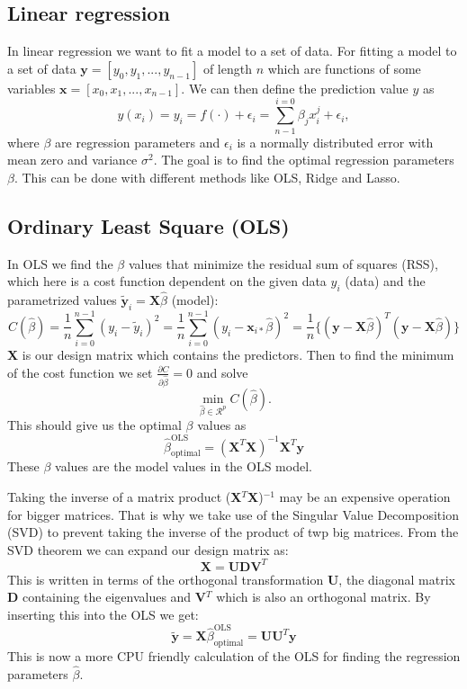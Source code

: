 \documentclass[12pt,a4paper,english]{article}
\begin{document}
\subsection{Linear regression}
In linear regression we want to fit a model to a set of data. For fitting a model to a set of data $\textbf{y}=[y_0, y_1,...,y_{n-1}]$ of length $n$ which are functions of some variables $\textbf{x}=[x_0, x_1,...,x_{n-1}]$. We can then define the prediction value $y$ as
\begin{equation}
\label{eq:pred_y}
y(x_i)=y_i=f(\cdot)+\epsilon_i=\sum_{n-1}^{i=0}\beta_jx_i^j+\epsilon_i,
\end{equation}
where $\beta$ are regression parameters and $\epsilon_i$ is a normally distributed error with mean zero and variance $\sigma^2$. The goal is to find the optimal regression parameters $\beta$. This can be done with different methods like OLS, Ridge and Lasso.

\subsection{Ordinary Least Square (OLS)}
In OLS we find the $\beta$ values that minimize the residual sum of squares (RSS), which here is a cost function dependent on the given data $y_i$ (data) and the parametrized values $\tilde{\textbf{y}}_i=\textbf{X}\hat{\beta}$ (model):
\begin{equation}
\label{eq:cost_OLS}
C(\hat{\beta})=\frac{1}{n}\sum_{i=0}^{n-1}(y_i-\tilde{y}_i)^2=\frac{1}{n}\sum_{i=0}^{n-1}(y_i-\textbf{x}_{i*}\hat{\beta})^2=\frac{1}{n}\{(\textbf{y}-\textbf{X}\hat{\beta})^T(\textbf{y}-\textbf{X}\hat{\beta})\}
\end{equation} 
\textbf{X} is our design matrix which contains the predictors. Then to find the minimum of the cost function we set $\frac{\partial C}{\partial \hat{\beta}}=0$ and solve
\[\min_{\hat{\beta}\in \mathcal{R}^p}C(\hat{\beta}).\] This should give us the optimal $\beta$ values as
\begin{equation}
\label{eq:beta_OLS_opt}
\hat{\beta}_{\text{optimal}}^{\text{OLS}}=(\textbf{X}^T\textbf{X})^{-1}\textbf{X}^T\textbf{y}
\end{equation}
These $\beta$ values are the model values in the OLS model.

Taking the inverse of a matrix product (\textbf{X}$^T$\textbf{X})$^{-1}$ may be an expensive operation for bigger matrices. That is why we take use of the Singular Value Decomposition (SVD) to prevent taking the inverse of the product of twp big matrices. From the SVD theorem we can expand our design matrix as:
\[\textbf{X}=\textbf{U}\textbf{D}\textbf{V}^T\]
This is written in terms of the orthogonal transformation \textbf{U}, the diagonal matrix \textbf{D} containing the eigenvalues and \textbf{V}$^T$ which is also an orthogonal matrix. By inserting this into the OLS we get:
\begin{equation}
\label{eq:beta_SVD_OLS}
\tilde{\textbf{y}}=\textbf{X}\hat{\beta}_{\text{optimal}}^{\text{OLS}}=\textbf{U}\textbf{U}^T\textbf{y}
\end{equation}
This is now a more CPU friendly calculation of the OLS for finding the regression parameters $\hat{\beta}$.
\end{document}
